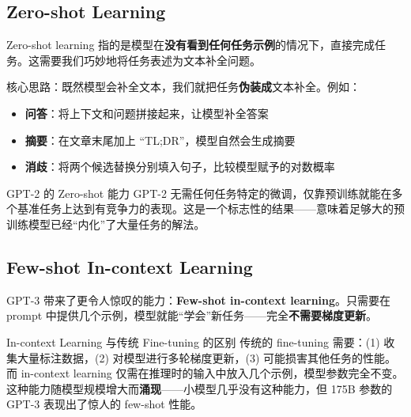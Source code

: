 \documentclass[a4paper]{article}
\begin{document}



\subsection{Zero-shot Learning}

Zero-shot learning 指的是模型在\textbf{没有看到任何任务示例}的情况下，直接完成任务。这需要我们巧妙地将任务表述为文本补全问题。





核心思路：既然模型会补全文本，我们就把任务\textbf{伪装成}文本补全。例如：
\begin{itemize}
    \item \textbf{问答}：将上下文和问题拼接起来，让模型补全答案
    \item \textbf{摘要}：在文章末尾加上 ``TL;DR''，模型自然会生成摘要
    \item \textbf{消歧}：将两个候选替换分别填入句子，比较模型赋予的对数概率
\end{itemize}





\begin{importantbox}{GPT-2 的 Zero-shot 能力}
GPT-2 无需任何任务特定的微调，仅靠预训练就能在多个基准任务上达到有竞争力的表现。这是一个标志性的结果——意味着足够大的预训练模型已经``内化''了大量任务的解法。
\end{importantbox}

\subsection{Few-shot In-context Learning}

GPT-3 带来了更令人惊叹的能力：\textbf{Few-shot in-context learning}。只需要在 prompt 中提供几个示例，模型就能``学会''新任务——完全\textbf{不需要梯度更新}。









\begin{knowledgebox}{In-context Learning 与传统 Fine-tuning 的区别}
传统的 fine-tuning 需要：(1) 收集大量标注数据，(2) 对模型进行多轮梯度更新，(3) 可能损害其他任务的性能。而 in-context learning 仅需在推理时的输入中放入几个示例，模型参数完全不变。这种能力随模型规模增大而\textbf{涌现}——小模型几乎没有这种能力，但 175B 参数的 GPT-3 表现出了惊人的 few-shot 性能。
\end{knowledgebox}
\end{document}
